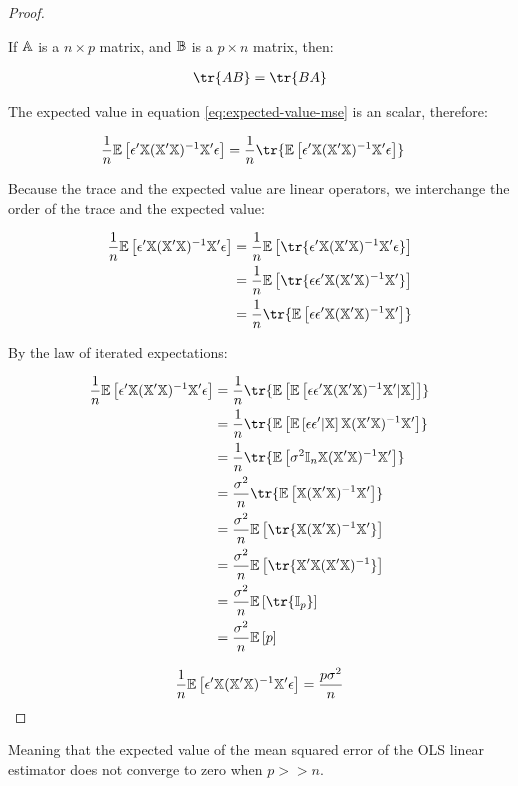\begin{proof}
\begin{lemma*}
    If $\mathbb{A}$ is a $n \times p$ matrix, and $\mathbb{B}$  is a $p \times n$ matrix, then:

    \begin{align*}
        \tr{AB} = \tr{BA}
    \end{align*}
\end{lemma*}

The expected value in equation \ref{eq:expected-value-mse} is an scalar, therefore:

\begin{align*}
\frac{1}{n} \E{
    \epsilon'\Mat{X}(\Mat{X}'\Mat{X})^{-1}\Mat{X}'\epsilon
}
&= \frac{1}{n} \tr{\E{
    \epsilon'\Mat{X}(\Mat{X}'\Mat{X})^{-1}\Mat{X}'\epsilon
}}
\end{align*}

Because the trace and the expected value are linear operators, we interchange the order of the trace and the expected value:

\begin{align*}
\frac{1}{n} \E{
    \epsilon'\Mat{X}(\Mat{X}'\Mat{X})^{-1}\Mat{X}'\epsilon
}
&= \frac{1}{n} \E{\tr{
    \epsilon'\Mat{X}(\Mat{X}'\Mat{X})^{-1}\Mat{X}'\epsilon
}} \\
&= \frac{1}{n} \E{\tr{
    \epsilon\epsilon'\Mat{X}(\Mat{X}'\Mat{X})^{-1}\Mat{X}'
}}\\
&= \frac{1}{n} \tr{\E{
    \epsilon\epsilon'\Mat{X}(\Mat{X}'\Mat{X})^{-1}\Mat{X}'
}}
\end{align*}

By the law of iterated expectations:

\begin{align*}
\frac{1}{n} \E{
    \epsilon'\Mat{X}(\Mat{X}'\Mat{X})^{-1}\Mat{X}'\epsilon
}
&= \frac{1}{n} \tr{\E{\E{
    \epsilon\epsilon'\Mat{X}(\Mat{X}'\Mat{X})^{-1}\Mat{X}'
 | \Mat{X}} }}\\
&= \frac{1}{n} \tr{\E{\E{
    \epsilon\epsilon'| \Mat{X}} \Mat{X}(\Mat{X}'\Mat{X})^{-1}\Mat{X}'}}\\
&= \frac{1}{n} \tr{
        \E{
            \sigma^2 \Mat{I}_n
            \Mat{X}(\Mat{X}'\Mat{X})^{-1}\Mat{X}'
        }
    }\\
&= \frac{\sigma^2}{n} \tr{
        \E{
            \Mat{X}(\Mat{X}'\Mat{X})^{-1}\Mat{X}'
        }
    }\\
&= \frac{\sigma^2}{n} \E{
        \tr{
            \Mat{X}(\Mat{X}'\Mat{X})^{-1}\Mat{X}'
        }
    }\\
&= \frac{\sigma^2}{n} \E{
        \tr{
            \Mat{X}'\Mat{X}(\Mat{X}'\Mat{X})^{-1}
        }
    }\\
&= \frac{\sigma^2}{n} \E{
        \tr{
           \Mat{I}_p 
        }
    }\\
&= \frac{\sigma^2}{n} \E{p}\\
\end{align*}

\begin{align*}
\frac{1}{n} \mathbb{E}\left[
    \epsilon'\mathbb{X}(\mathbb{X}'\mathbb{X})^{-1}\mathbb{X}'\epsilon
\right]
&= \frac{p\sigma^2}{n}\\
\end{align*}

\end{proof}

Meaning that the expected value of the mean squared error of the OLS linear estimator does not converge to zero when $p >> n$.